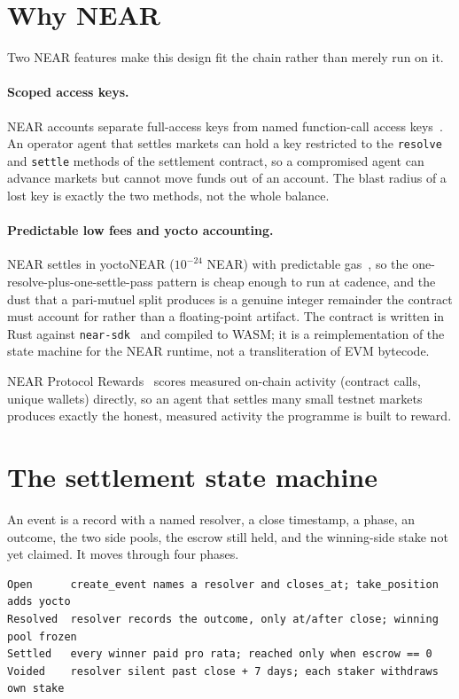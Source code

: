 \documentclass[11pt]{article}
\begin{document}
\section{Why NEAR}

Two NEAR features make this design fit the chain rather than merely run on it.

\paragraph{Scoped access keys.} NEAR accounts separate full-access keys from
named function-call access keys~\cite{near_docs_access_keys_2026}. An operator
agent that settles markets can hold a key restricted to the \texttt{resolve} and
\texttt{settle} methods of the settlement contract, so a compromised agent can
advance markets but cannot move funds out of an account. The blast radius of a
lost key is exactly the two methods, not the whole balance.

\paragraph{Predictable low fees and yocto accounting.} NEAR settles in
yoctoNEAR ($10^{-24}$ NEAR) with predictable gas~\cite{near_nomicon_2026}, so the
one-resolve-plus-one-settle-pass pattern is cheap enough to run at cadence, and
the dust that a pari-mutuel split produces is a genuine integer remainder the
contract must account for rather than a floating-point artifact. The contract is
written in Rust against \texttt{near-sdk}~\cite{near_sdk_rs_2026} and compiled to
WASM; it is a reimplementation of the state machine for the NEAR runtime, not a
transliteration of EVM bytecode.

NEAR Protocol Rewards~\cite{near_protocol_rewards_2026} scores measured on-chain
activity (contract calls, unique wallets) directly, so an agent that settles many
small testnet markets produces exactly the honest, measured activity the
programme is built to reward.

\section{The settlement state machine}

An event is a record with a named resolver, a close timestamp, a phase, an
outcome, the two side pools, the escrow still held, and the winning-side stake
not yet claimed. It moves through four phases.

\begin{lstlisting}
Open      create_event names a resolver and closes_at; take_position adds yocto
Resolved  resolver records the outcome, only at/after close; winning pool frozen
Settled   every winner paid pro rata; reached only when escrow == 0
Voided    resolver silent past close + 7 days; each staker withdraws own stake
\end{lstlisting}
\end{document}
